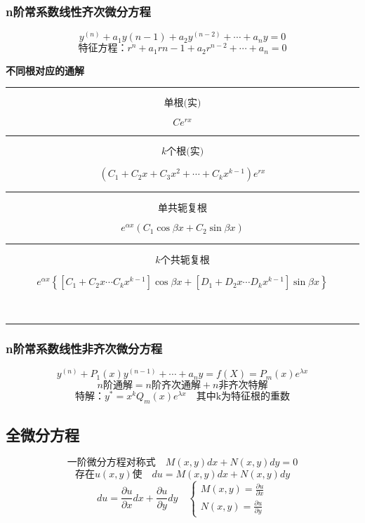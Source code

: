 \subsubsection{n阶常系数线性齐次微分方程}
$$y^{(n)}+a_1y{(n-1)}+a_2y^{(n-2)}+\cdots+a_ny=0$$
$$\mbox{特征方程：}r^n+a_1r{n-1}+a_2r^{n-2}+\cdots+a_n=0$$
\centerline{\textbf{不同根对应的通解}}
\noindent\rule[\fill]{\textwidth}{0.4pt}
\begin{minipage}{.2\textwidth}
$$\mbox{单根(实)}$$
\end{minipage}
\hfill
\vline
\begin{minipage}{.8\textwidth}
	$$Ce^{rx}$$
\end{minipage}
\noindent\rule[\fill]{\textwidth}{0.4pt}
\begin{minipage}{.2\textwidth}
	$$\mbox{$k$个根(实)}$$
\end{minipage}
\hfill
\vline
\begin{minipage}{.8\textwidth}
	$$(C_1+C_2x+C_3x^2+\cdots+C_kx^{k-1})e^{rx}$$
\end{minipage}
\noindent\rule[\fill]{\textwidth}{0.4pt}
\begin{minipage}{.2\textwidth}
	$$\mbox{单共轭复根}$$
\end{minipage}
\hfill
\vline
\begin{minipage}{.8\textwidth}
	$$e^{\alpha x}(C_1\cos\beta x+C_2\sin\beta x)$$
\end{minipage}
\noindent\rule[\fill]{\textwidth}{0.4pt}
\begin{minipage}{.2\textwidth}
	$$\mbox{$k$个共轭复根}$$
\end{minipage}
\hfill
\vline
\begin{minipage}{.8\textwidth}
	$$e^{\alpha x}\left\{\left[C_1+C_2x\cdots C_kx^{k-1}\right]\cos\beta x+\left[D_1+D_2x\cdots D_kx^{k-1}\right]\sin\beta x\right\}$$
\end{minipage}\\ 
\noindent\rule[\fill]{\textwidth}{0.4pt}
\subsubsection{n阶常系数线性非齐次微分方程}
$$y^{(n)}+P_1(x)y^{(n-1)}+\cdots+a_ny=f(X)=P_m(x)e^{\lambda x}$$
$$n\mbox{阶通解}=n\mbox{阶齐次通解}+n\mbox{非齐次特解}$$
$$\mbox{特解：}y^*=x^kQ_m(x)e^{\lambda x}\quad\mbox{其中k为特征根的重数}$$
\subsection{全微分方程}
$$\mbox{一阶微分方程对称式}\quad M(x,y)dx+N(x,y)dy=0$$
$$\mbox{存在}u(x,y)\mbox{使}\quad du=M(x,y)dx+N(x,y)dy$$
$$du=\frac{\partial u}{\partial x}dx+\frac{\partial u}{\partial y}dy\quad\begin{cases}
	M(x,y)=\frac{\partial u}{\partial x}\\
	N(x,y)=\frac{\partial u}{\partial y}
\end{cases}$$